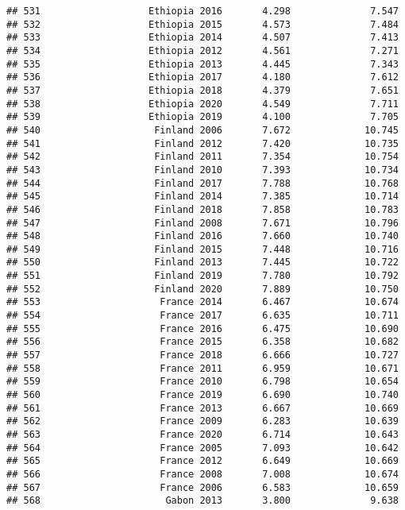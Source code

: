 \documentclass[
]{article}
\begin{document}
\begin{verbatim}
## 531                   Ethiopia 2016       4.298              7.547
## 532                   Ethiopia 2015       4.573              7.484
## 533                   Ethiopia 2014       4.507              7.413
## 534                   Ethiopia 2012       4.561              7.271
## 535                   Ethiopia 2013       4.445              7.343
## 536                   Ethiopia 2017       4.180              7.612
## 537                   Ethiopia 2018       4.379              7.651
## 538                   Ethiopia 2020       4.549              7.711
## 539                   Ethiopia 2019       4.100              7.705
## 540                    Finland 2006       7.672             10.745
## 541                    Finland 2012       7.420             10.735
## 542                    Finland 2011       7.354             10.754
## 543                    Finland 2010       7.393             10.734
## 544                    Finland 2017       7.788             10.768
## 545                    Finland 2014       7.385             10.714
## 546                    Finland 2018       7.858             10.783
## 547                    Finland 2008       7.671             10.796
## 548                    Finland 2016       7.660             10.740
## 549                    Finland 2015       7.448             10.716
## 550                    Finland 2013       7.445             10.722
## 551                    Finland 2019       7.780             10.792
## 552                    Finland 2020       7.889             10.750
## 553                     France 2014       6.467             10.674
## 554                     France 2017       6.635             10.711
## 555                     France 2016       6.475             10.690
## 556                     France 2015       6.358             10.682
## 557                     France 2018       6.666             10.727
## 558                     France 2011       6.959             10.671
## 559                     France 2010       6.798             10.654
## 560                     France 2019       6.690             10.740
## 561                     France 2013       6.667             10.669
## 562                     France 2009       6.283             10.639
## 563                     France 2020       6.714             10.643
## 564                     France 2005       7.093             10.642
## 565                     France 2012       6.649             10.669
## 566                     France 2008       7.008             10.674
## 567                     France 2006       6.583             10.659
## 568                      Gabon 2013       3.800              9.638

\end{verbatim}
\end{document}
